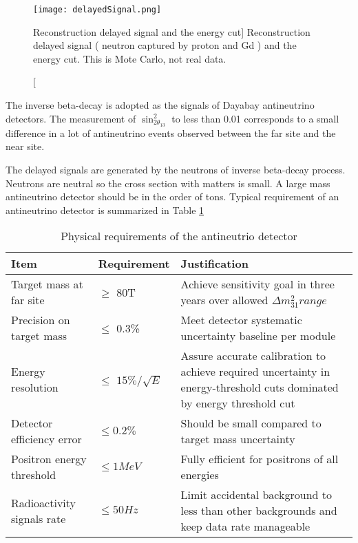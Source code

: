 \begin{figure}
    \label{fig:delayedSignal}
    \centering
    \texttt{[image: delayedSignal.png]}
    \caption
    [Reconstruction delayed signal and the energy cut]
    {Reconstruction delayed signal ( neutron captured by proton and Gd ) and the energy cut. This is Mote Carlo, not real data.}
    \end{figure}





The inverse beta-decay is adopted as the signals of Dayabay antineutrino detectors.
The measurement of $\sin^{2}_{2\theta_{13}}$ to less than 0.01 corresponds to a small
difference in a lot of antineutrino events observed between the far site and
the near site.

The delayed signals are generated by the neutrons of inverse beta-decay process.
Neutrons are neutral so the cross section with matters is small.
A large mass antineutrino detector should be in the order of tons.
Typical requirement of an antineutrino detector is summarized in Table \ref{tab:ADRequirement}


\begin{table}
\centering
\caption{Physical requirements of the antineutrio detector\cite{TDR}}
\label{tab:ADRequirement}
\begin{tabular}{lp{2.5cm}p{5.0cm}}
\hline
Item & Requirement & Justification\\
\hline
\hline
Target mass at far site &
$\geq$ 80T &
Achieve sensitivity goal in three years over allowed ${\Delta}m^{2}_31 range$ \\
\hline
Precision on target mass &
$\leq$ 0.3\% &
Meet detector systematic uncertainty baseline per module \\
\hline
Energy resolution &
$\leq$ $15\%/\sqrt{E}$ &
Assure accurate calibration to achieve required uncertainty in energy-threshold cuts dominated by energy threshold cut \\
\hline
Detector efficiency error &
$\leq 0.2\%$ &
Should be small compared to target mass uncertainty \\
\hline
Positron energy threshold &
$\leq 1MeV$ &
Fully efficient for positrons of all energies \\
Radioactivity signals rate &
$\leq 50 Hz$ &
Limit accidental background to less than other backgrounds and keep data rate manageable \\
\hline
\end{tabular}
\end{table}


